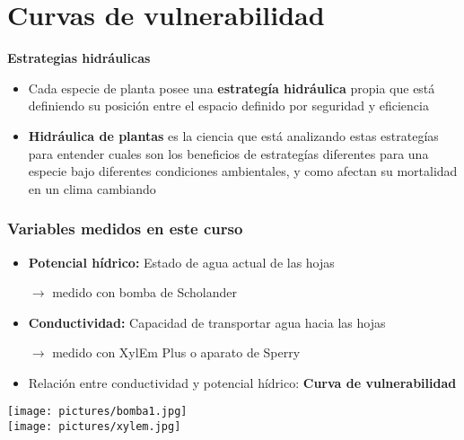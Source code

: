 \documentclass[usepdftitle=false]{beamer}
\newcommand{\Blue}[1]{{\color{blue!50!black}\textbf{#1}}}
\newcommand{\rar}{$\rightarrow$}
\newcommand{\tw}{\textwidth}
\begin{document}
\section{Curvas de vulnerabilidad}
\begin{frame}
	\begin{block}{\textbf{Estrategias hidráulicas}}
	\begin{itemize}
		\item Cada especie de planta posee una\textbf{ estrategía hidráulica} propia que está definiendo su posición entre el espacio definido por seguridad y eficiencia
		\item \textbf{Hidráulica de plantas} es la ciencia que está analizando estas estrategías para entender  cuales son los beneficios de estrategías diferentes para una especie bajo diferentes condiciones ambientales, y como afectan su mortalidad en un clima cambiando		
	\end{itemize}
	\end{block}
\end{frame}



\begin{frame}
	\frametitle{Variables medidos en este curso}

	   \begin{minipage}{0.68 \tw}
         	\begin{itemize} 
         		\item \Blue{Potencial hídrico:} Estado de agua actual de las hojas 
         		\item[\rar]medido con bomba de Scholander 
         		\item \Blue{Conductividad:} Capacidad de transportar  agua hacia las hojas
         		\item[\rar] medido con XylEm Plus o aparato de Sperry		
         		\item<visible@2| alert@2> Relación entre conductividad y potencial hídrico: \textbf{Curva de vulnerabilidad}
         	\end{itemize}	 
	   \end{minipage}
		\begin{minipage}{0.3\tw}
          \texttt{[image: pictures/bomba1.jpg]}\\
          \texttt{[image: pictures/xylem.jpg]}
		\end{minipage}	
\end{frame}
\end{document}
